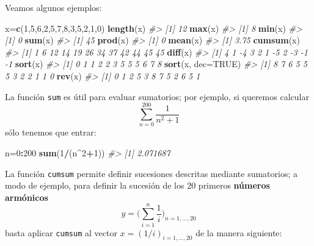 \documentclass[
]{book}
\newenvironment{Shaded}{\begin{snugshade}}{\end{snugshade}}
\newcommand{\CommentTok}[1]{\textcolor[rgb]{0.56,0.35,0.01}{\textit{#1}}}
\newcommand{\DataTypeTok}[1]{\textcolor[rgb]{0.13,0.29,0.53}{#1}}
\newcommand{\DecValTok}[1]{\textcolor[rgb]{0.00,0.00,0.81}{#1}}
\newcommand{\KeywordTok}[1]{\textcolor[rgb]{0.13,0.29,0.53}{\textbf{#1}}}
\newcommand{\NormalTok}[1]{#1}
\newcommand{\OperatorTok}[1]{\textcolor[rgb]{0.81,0.36,0.00}{\textbf{#1}}}
\newcommand{\OtherTok}[1]{\textcolor[rgb]{0.56,0.35,0.01}{#1}}
\theoremstyle{definition}
\theoremstyle{definition}
\theoremstyle{definition}
\theoremstyle{remark}
\begin{document}
Veamos algunos ejemplos:

\begin{Shaded}
\begin{Highlighting}[]
\NormalTok{x=}\KeywordTok{c}\NormalTok{(}\DecValTok{1}\NormalTok{,}\DecValTok{5}\NormalTok{,}\DecValTok{6}\NormalTok{,}\DecValTok{2}\NormalTok{,}\DecValTok{5}\NormalTok{,}\DecValTok{7}\NormalTok{,}\DecValTok{8}\NormalTok{,}\DecValTok{3}\NormalTok{,}\DecValTok{5}\NormalTok{,}\DecValTok{2}\NormalTok{,}\DecValTok{1}\NormalTok{,}\DecValTok{0}\NormalTok{)}
\KeywordTok{length}\NormalTok{(x)}
\CommentTok{\#\textgreater{} [1] 12}
\KeywordTok{max}\NormalTok{(x)}
\CommentTok{\#\textgreater{} [1] 8}
\KeywordTok{min}\NormalTok{(x)}
\CommentTok{\#\textgreater{} [1] 0}
\KeywordTok{sum}\NormalTok{(x)}
\CommentTok{\#\textgreater{} [1] 45}
\KeywordTok{prod}\NormalTok{(x)}
\CommentTok{\#\textgreater{} [1] 0}
\KeywordTok{mean}\NormalTok{(x)}
\CommentTok{\#\textgreater{} [1] 3.75}
\KeywordTok{cumsum}\NormalTok{(x)}
\CommentTok{\#\textgreater{}  [1]  1  6 12 14 19 26 34 37 42 44 45 45}
\KeywordTok{diff}\NormalTok{(x)}
\CommentTok{\#\textgreater{}  [1]  4  1 {-}4  3  2  1 {-}5  2 {-}3 {-}1 {-}1}
\KeywordTok{sort}\NormalTok{(x)}
\CommentTok{\#\textgreater{}  [1] 0 1 1 2 2 3 5 5 5 6 7 8}
\KeywordTok{sort}\NormalTok{(x, }\DataTypeTok{dec=}\OtherTok{TRUE}\NormalTok{)}
\CommentTok{\#\textgreater{}  [1] 8 7 6 5 5 5 3 2 2 1 1 0}
\KeywordTok{rev}\NormalTok{(x)}
\CommentTok{\#\textgreater{}  [1] 0 1 2 5 3 8 7 5 2 6 5 1}
\end{Highlighting}
\end{Shaded}

La función \texttt{sum} es útil para evaluar sumatorios; por ejemplo, si queremos calcular
\[
\sum_{n=0}^{200} \frac{1}{n^2+1}
\]
sólo tenemos que entrar:

\begin{Shaded}
\begin{Highlighting}[]
\NormalTok{n=}\DecValTok{0}\OperatorTok{:}\DecValTok{200}
\KeywordTok{sum}\NormalTok{(}\DecValTok{1}\OperatorTok{/}\NormalTok{(n}\OperatorTok{\^{}}\DecValTok{2}\OperatorTok{+}\DecValTok{1}\NormalTok{))}
\CommentTok{\#\textgreater{} [1] 2.071687}
\end{Highlighting}
\end{Shaded}

La función \texttt{cumsum} permite definir sucesiones descritas mediante sumatorios; a modo de ejemplo, para definir la sucesión de los 20 primeros \textbf{números armónicos}
\[
y=\Big(\sum_{i=1}^n \frac{1}{i}\Big)_{n=1, \ldots, 20}
\]
basta aplicar \texttt{cumsum} al vector \(x=(1/i)_{i=1, \ldots, 20}\) de la manera siguiente:
\end{document}
